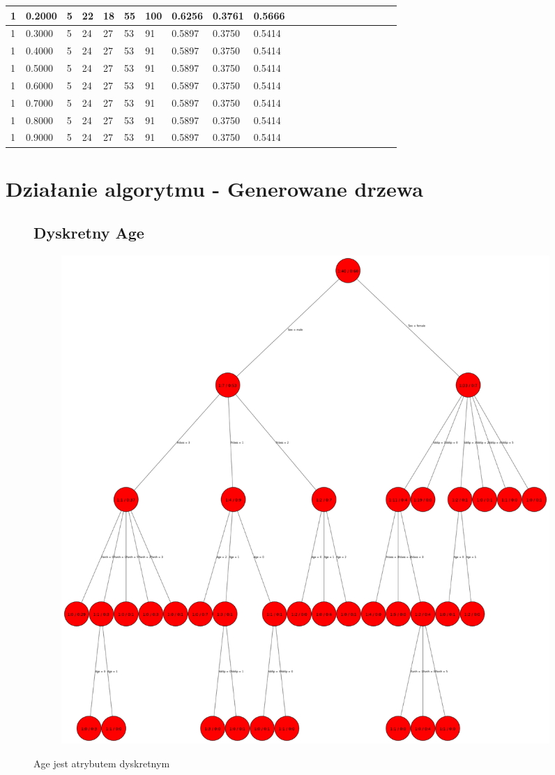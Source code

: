 \documentclass[12pt]{article}
\begin{document}
\begin{flushleft}
{\begin{tabular}{| l | l | l | l | l | l | l | l | l | l | l | l | l | l | l | l | l | l | l | l | l |}
				1 & 0.2000 & 5 & 22 & 18 & 55 & 100 & 0.6256 & 0.3761 & 0.5666\\ \hline
				1 & 0.3000 & 5 & 24 & 27 & 53 & 91 & 0.5897 & 0.3750 & 0.5414\\ \hline
				1 & 0.4000 & 5 & 24 & 27 & 53 & 91 & 0.5897 & 0.3750 & 0.5414\\ \hline
				1 & 0.5000 & 5 & 24 & 27 & 53 & 91 & 0.5897 & 0.3750 & 0.5414\\ \hline
				1 & 0.6000 & 5 & 24 & 27 & 53 & 91 & 0.5897 & 0.3750 & 0.5414\\ \hline
				1 & 0.7000 & 5 & 24 & 27 & 53 & 91 & 0.5897 & 0.3750 & 0.5414\\ \hline
				1 & 0.8000 & 5 & 24 & 27 & 53 & 91 & 0.5897 & 0.3750 & 0.5414\\ \hline
				1 & 0.9000 & 5 & 24 & 27 & 53 & 91 & 0.5897 & 0.3750 & 0.5414\\ \hline
				
			\end{tabular}
	}\end{flushleft}

\clearpage
\section{Działanie algorytmu - Generowane drzewa}
\begin{figure}[h!]
	\subsection{Dyskretny Age}
	\centering
	\begin{subfigure}[b]{1\linewidth}
		\includegraphics[width=\linewidth]{Dyskretny.png}
	\end{subfigure}
	\label{fig:dyskretne}
	\caption{Age jest atrybutem dyskretnym}
\end{figure}
\end{document}
